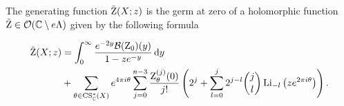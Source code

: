 \begin{proposition} \label{thm:ExactGeneratingFunction} The generating function $\tilde{\operatorname{Z}}(X;z)$ is the germ at zero of a holomorphic function
	$\tilde{\operatorname{Z}} \in \mathcal{O}(\mathbb{C} \setminus e\Lambda )$ given by the following formula
	
	\begin{align} \begin{split} \label{eq:exact}
	\tilde{\operatorname{Z}}(X;z)&= \int_0^{\infty} \frac{e^{-2y} \mathcal{B}(\operatorname{Z}_0)(y) }{1-ze^{-y}} \operatorname{{d}\hskip-.6mm} y
	\\&+\sum_{\theta \in \operatorname{CS}_{\mathbb{C}}^*(X)}  e^{4\pi i \theta} \sum_{j=0}^{n-3} \frac{\operatorname{Z}_{\theta}^{(j)}(0)}{j!} \left(2^j +\sum_{l=0}^j 2^{j-l} \binom{j}{l} \operatorname{Li}_{-l} \left(ze^{2\pi i \theta}\right)\right). 
	\end{split} 
	\end{align}
\end{proposition}

